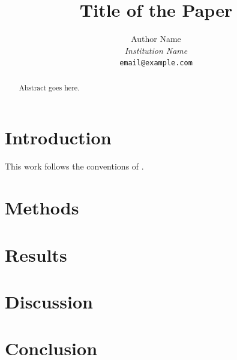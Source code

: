 \documentclass[11pt]{article}
\title{Title of the Paper}
\author{Author Name \\
\textit{Institution Name} \\
\texttt{email@example.com}}
\date{}
\begin{document}
\maketitle

\begin{abstract}
\noindent
Abstract goes here. \lipsum[1]
\end{abstract}

\section{Introduction}
\lipsum[2-3] This work follows the conventions of \cite{lamport94}.

\section{Methods}
\lipsum[4]

\section{Results}
\lipsum[5]

\section{Discussion}
\lipsum[6]

\section{Conclusion}
\lipsum[7]



\end{document}

